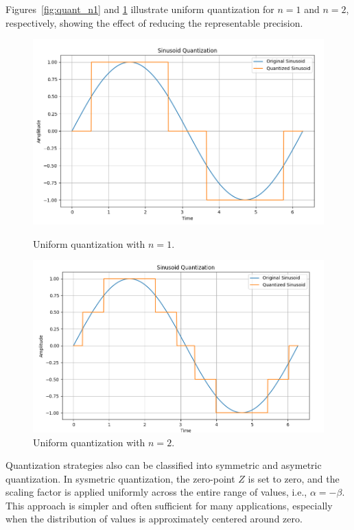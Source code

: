 Figures~\ref{fig:quant_n1} and \ref{fig:quant_n2} illustrate uniform quantization for $n=1$ and $n=2$, respectively, showing the effect of reducing the representable precision.
\begin{figure}[H]
    \centering
    \begin{minipage}{0.48\textwidth}
        \centering
        \includegraphics[width=0.75\linewidth]{figuras/2-fundamentos/quantization_n=1.png}
        \caption{Uniform quantization with $n=1$.}
        \label{fig:quant_n1}
    \end{minipage}
    \hfill
    \begin{minipage}{0.48\textwidth}
        \centering
        \includegraphics[width=0.75\linewidth]{figuras/2-fundamentos/quantization_n=2.png}
        \caption{Uniform quantization with $n=2$.}
        \label{fig:quant_n2}
    \end{minipage}
\end{figure}

Quantization strategies also can be classified into symmetric and asymetric quantization. In sysmetric quantization, the zero-point $Z$ is set to zero, and the scaling factor is applied uniformly across the entire range of values, i.e., $\alpha = -\beta$. This approach is simpler and often sufficient for many applications, especially when the distribution of values is approximately centered around zero.

